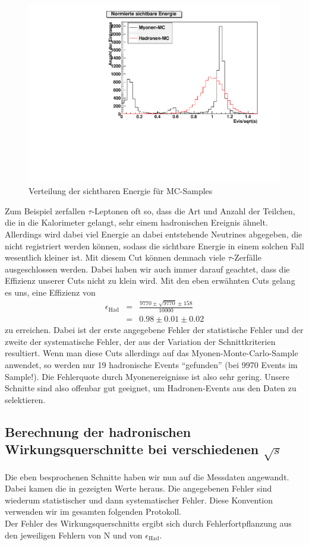 \begin{figure}[htb]
	\centering
	\includegraphics[width=1\columnwidth,keepaspectratio]{Evisvgl_mc.pdf}
	\caption{Verteilung der sichtbaren Energie für MC-Samples}
	\label{fig:Evisvgl_mc}
\end{figure}
Zum Beispiel zerfallen $\tau$-Leptonen oft so, dass die Art und Anzahl der Teilchen, die in die Kalorimeter gelangt, sehr einem hadronischen Ereignis ähnelt. Allerdings wird dabei viel Energie an dabei entstehende Neutrines abgegeben, die nicht registriert werden können, sodass die sichtbare Energie in einem solchen Fall wesentlich kleiner ist. Mit diesem Cut können demnach viele $\tau$-Zerfälle ausgeschlossen werden. Dabei haben wir auch immer darauf geachtet, dass die Effizienz unserer Cuts nicht zu klein wird. Mit den eben erwähnten Cuts gelang es uns, eine Effizienz von
\begin{eqnarray}
\epsilon_\mathrm{Had} &=& \frac{9770 \pm \sqrt{9770} \pm 158}{10000}\\
&=& 0.98 \pm 0.01 \pm 0.02
\end{eqnarray}
zu erreichen. Dabei ist der erste angegebene Fehler der statistische Fehler und der zweite der systematische Fehler, der aus der Variation der Schnittkriterien resultiert. Wenn man diese Cuts allerdings auf das Myonen-Monte-Carlo-Sample anwendet, so werden nur 19 hadronische Events ``gefunden'' (bei 9970 Events im Sample!). Die Fehlerquote durch Myonenereignisse ist also sehr gering. Unsere Schnitte sind also offenbar gut geeignet, um Hadronen-Events aus den Daten zu selektieren.

\subsection{Berechnung der hadronischen Wirkungsquerschnitte bei verschiedenen $\sqrt{s}$}
Die eben besprochenen Schnitte haben wir nun auf die Messdaten angewandt. Dabei kamen die in  gezeigten Werte heraus. Die angegebenen Fehler sind wiederum statistischer und dann systematischer Fehler. Diese Konvention verwenden wir im gesamten folgenden Protokoll.\\
Der Fehler des Wirkungsquerschnitts ergibt sich durch Fehlerfortpflanzung aus den jeweiligen Fehlern von N und von $\epsilon_\mathrm{Had}$.

